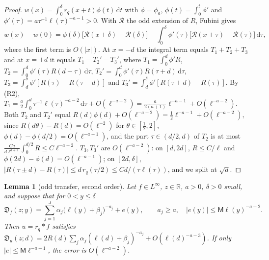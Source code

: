\documentclass[11pt]{amsart}
\newcommand{\R}{\mathbb{R}}
\newcommand{\Dj}{\mathfrak{D}}
\newcommand{\dd}{\,\mathrm{d}}
\newtheorem{lemma}[theorem]{Lemma}
\theoremstyle{definition}
\theoremstyle{remark}
\numberwithin{equation}{section}
\begin{document}
\begin{proof}
$w(x)=\int_0^\delta r_q(x+t)\phi(t)\dd t$ with $\phi=\phi_a$, $\phi(t)=\int_0^t\phi'$ and $\phi'(\tau)=a\tau^{-1}\ell(\tau)^{-a-1}>0$. With $\mathcal R$ the odd extension of $R$, Fubini gives
\begin{equation}\label{eq:transfer}
w(x)-w(0)=\phi(\delta)\bigl[\mathcal R(x+\delta)-\mathcal R(\delta)\bigr]-\int_0^\delta\phi'(\tau)\bigl[\mathcal R(x+\tau)-\mathcal R(\tau)\bigr]\dd\tau,
\end{equation}
where the first term is $O(|x|)$. At $x=-d$ the integral term equals $T_1+T_2+T_3$ and at $x=+d$ it equals $T_1-T_2'-T_3'$, where
$T_1=\int_0^d\phi'R$, $T_2=\int_0^d\phi'(\tau)R(d-\tau)\dd\tau$, $T_2'=\int_0^d\phi'(\tau)R(\tau+d)\dd\tau$, $T_3=\int_d^\delta\phi'[R(\tau)-R(\tau-d)]$ and $T_3'=\int_d^\delta\phi'[R(\tau+d)-R(\tau)]$. By (R2), $T_1=\frac a2\int_0^d\tau^{-1}\ell(\tau)^{-a-2}\dd\tau+O(\ell^{-a-2})=\frac a{2(a+1)}\ell^{-a-1}+O(\ell^{-a-2})$. Both $T_2$ and $T_2'$ equal $R(d)\phi(d)+O(\ell^{-a-2})=\frac12\ell^{-a-1}+O(\ell^{-a-2})$, since $R(d\theta)-R(d)=O(\ell^{-2})$ for $\theta\in[\frac12,2]$, $\phi(d)-\phi(d/2)=O(\ell^{-a-1})$, and the part $\tau\in(d/2,d)$ of $T_2$ is at most $\frac{Ca}{d\ell^{a+1}}\int_0^{d/2}R\le C\ell^{-a-2}$. $T_3,T_3'$ are $O(\ell^{-a-2})$: on $[d,2d]$, $R\le C/\ell$ and $\phi(2d)-\phi(d)=O(\ell^{-a-1})$; on $[2d,\delta]$, $|R(\tau\pm d)-R(\tau)|\le d\,r_q(\tau/2)\le Cd/(\tau\ell(\tau))$, and we split at $\sqrt d$.
\end{proof}

\begin{lemma}[odd transfer, second order]\label{lem:oddtransfer}
Let $f\in L^\infty$, $z\in\R$, $a>0$, $\delta>0$ small, and suppose that for $0<y\le\delta$
\[
\Dj_f(z;y)=\sum_{j=1}^J\alpha_j\bigl(\ell(y)+\beta_j\bigr)^{-a_j}+e(y),\qquad a_j\ge a,\quad|e(y)|\le \mathsf M\ell(y)^{-a-2}.
\]
Then $u=r_q*f$ satisfies $\Dj_u(z;d)=2R(d)\sum_j\alpha_j(\ell(d)+\beta_j)^{-a_j}+O(\ell(d)^{-a-3})$. If only $|e|\le \mathsf M\ell^{-a-1}$, the error is $O(\ell^{-a-2})$.
\end{lemma}
\end{document}
